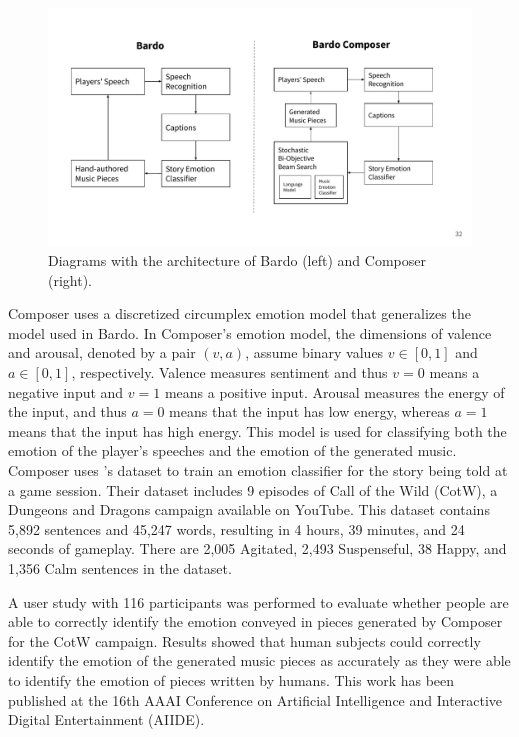 \begin{figure}[h]
\centering
 \includegraphics[width=\columnwidth]{imgs/aiide20/composer.pdf}
 \caption{Diagrams with the architecture of Bardo (left) and Composer (right). }
 \label{fig:bardo}
\end{figure}

Composer uses a discretized circumplex emotion model \cite{russell1980circumplex} that generalizes the model used in Bardo. In Composer's emotion model, the dimensions of valence and arousal, denoted by a pair $(v,a)$, assume  binary values $v \in [0, 1]$ and $a \in [0, 1]$, respectively. Valence measures sentiment and thus $v = 0$ means a negative input and $v = 1$ means a positive input. Arousal measures the energy of the input, and thus $a = 0$ means that the input has low energy, whereas $a = 1$ means that the input has high energy. This model is used for classifying both the emotion of the player's speeches and the emotion of the generated music. Composer uses \citet{padovani2017}'s dataset to train an emotion classifier for the story being told at a game session. Their dataset includes 9 episodes of Call of the Wild (CotW), a Dungeons and Dragons campaign available on YouTube. This dataset contains 5,892 sentences and 45,247 words, resulting in 4 hours, 39 minutes, and 24 seconds of gameplay. There are 2,005 Agitated, 2,493 Suspenseful, 38 Happy, and 1,356 Calm sentences in the dataset.

A user study with 116 participants was performed to evaluate whether people are able to correctly identify the emotion conveyed in pieces generated by Composer for the CotW campaign. Results showed that human subjects could correctly identify the emotion of the generated music pieces as accurately as they were able to identify the emotion of pieces written by humans. This work has been published at the 16th AAAI Conference on Artificial Intelligence and Interactive Digital Entertainment (AIIDE).

